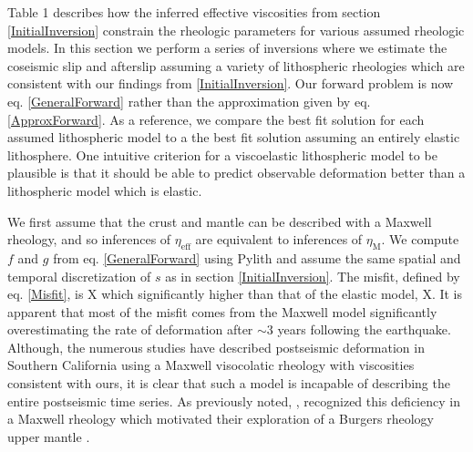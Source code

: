 \documentclass[12pt]{article}
\begin{document}
Table 1 describes how the inferred effective viscosities from section \ref{InitialInversion} constrain the rheologic parameters for various assumed rheologic models. In this section we perform a series of inversions where we estimate the coseismic slip and afterslip assuming a variety of lithospheric rheologies which are consistent with our findings from \ref{InitialInversion}.  Our forward problem is now eq. \ref{GeneralForward} rather than the approximation given by eq. \ref{ApproxForward}.  As a reference, we compare the best fit solution for each assumed lithospheric model to a the best fit solution assuming an entirely elastic lithosphere. One intuitive criterion for a viscoelastic lithospheric model to be plausible is that it should be able to predict observable deformation better than a lithospheric model which is elastic.   

We first assume that the crust and mantle can be described with a Maxwell rheology, and so inferences of $\eta_{\mathrm{eff}}$ are equivalent to inferences of $\eta_{\mathrm{M}}$. We compute $f$ and $g$ from eq. \ref{GeneralForward} using Pylith \cite{Aagaard2009} and assume the same spatial and temporal discretization of $s$ as in section \ref{InitialInversion}. The misfit, defined by eq. \ref{Misfit}, is X which significantly higher than that of the elastic model, X.  It is apparent that most of the misfit comes from the Maxwell model significantly overestimating the rate of deformation after $\sim 3$ years following the earthquake.  Although, the numerous studies have described postseismic deformation in Southern California using a Maxwell visocolatic rheology with viscosities consistent with ours, it is clear that such a model is incapable of describing the entire postseismic time series. As previously noted, \cite{Pollitz2001}, recognized this deficiency in a Maxwell rheology which motivated their exploration of a Burgers rheology upper mantle \cite{Pollitz2003}.
\end{document}
